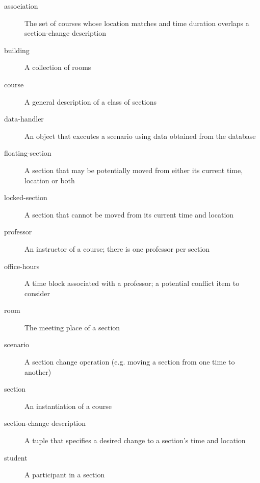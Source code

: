 \begin{description}
  \item[association] The set of courses whose location matches and time duration overlaps a section-change description
  \item[building] A collection of rooms
  \item[course] A general description of a class of sections
  \item[data-handler] An object that executes a scenario using data obtained from the database
  \item[floating-section] A section that may be potentially moved from either its current time, location or both
  \item[locked-section] A section that cannot be moved from its current time and location
  \item[professor] An instructor of a course; there is one professor per section
  \item[office-hours] A time block associated with a professor; a potential conflict item to consider
  \item[room] The meeting place of a section
  \item[scenario] A section change operation (e.g. moving a section from one time to another)
  \item[section] An instantiation of a course
  \item[section-change description] A tuple that specifies a desired change to a section's time and location
  \item[student] A participant in a section
\end{description}
